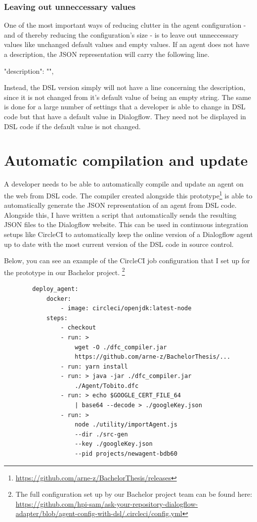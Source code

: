 \subsubsection{Leaving out unneccessary values}

One of the most important ways of reducing clutter in the agent configuration - and of thereby reducing the configuration's size - is to leave out unneccessary values like unchanged default values and empty values.
If an agent does not have a description, the JSON representation will carry the following line.
\begin{JSON}
    "description": "",
\end{JSON}
Instead, the DSL version simply will not have a line concerning the description, since it is not changed from it's default value of being an empty string.
The same is done for a large number of settings that a developer is able to change in DSL code but that have a default value in Dialogflow. They need not be displayed in DSL code if the default value is not changed.


\section{Automatic compilation and update}
A developer needs to be able to automatically compile and update an agent on the web from DSL code.
The compiler created alongside this prototype\footnote{\url{https://github.com/arne-z/BachelorThesis/releases}} is able to automatically generate the JSON representation of an agent from DSL code.
Alongside this, I have written a script that automatically sends the resulting JSON files to the Dialogflow website.
This can be used in continuous integration setups like CircleCI \cite{CircleCI} to automatically keep the online version of a Dialogflow agent up to date with the most current version of the DSL code in source control.

Below, you can see an example of the CircleCI job configuration that I set up for the prototype in our Bachelor project.
\footnote{The full configuration set up by our Bachelor project team can be found here:\\
\url{https://github.com/hpi-sam/ask-your-repository-dialogflow-adapter/blob/agent-config-with-dsl/.circleci/config.yml}}
\begin{samepage}    
    \begin{lstlisting}
        deploy_agent:
            docker:
                - image: circleci/openjdk:latest-node
            steps:
                - checkout
                - run: > 
                    wget -O ./dfc_compiler.jar
                    https://github.com/arne-z/BachelorThesis/...
                - run: yarn install
                - run: > java -jar ./dfc_compiler.jar 
                    ./Agent/Tobito.dfc
                - run: > echo $GOOGLE_CERT_FILE_64 
                    | base64 --decode > ./googleKey.json
                - run: >
                    node ./utility/importAgent.js 
                    --dir ./src-gen 
                    --key ./googleKey.json 
                    --pid projects/newagent-bdb60
    \end{lstlisting}
\end{samepage}

